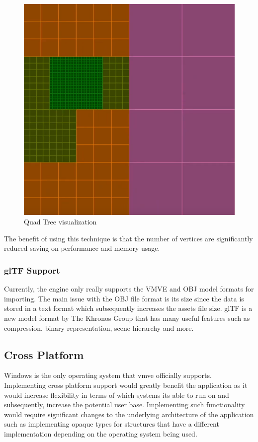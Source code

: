\documentclass[11pt]{article}
\begin{document}
\begin{figure}[h!]
  \centering
  \includegraphics[width=\textwidth]{images/quad_tree.png}
  \caption{Quad Tree visualization}
  \label{fig:quad_tree}
\end{figure}

The benefit of using this technique is that the number of vertices are
significantly reduced saving on performance and memory usage.


\subsubsection{glTF Support}
Currently, the engine only really supports the VMVE and OBJ model formats for
importing. The main issue with the OBJ file format is its size since the data is
stored in a text format which subsequently increases the assets file size. glTF
\cite{gltf} is a new model format by The Khronos Group that has many useful
features such as compression, binary representation, scene hierarchy and more.

\subsection{Cross Platform}
Windows is the only operating system that \gls{vmve} officially supports.
Implementing cross platform support would greatly benefit the application as it
would increase flexibility in terms of which systems its able to run on and
subsequently, increase the potential user base. Implementing such functionality
would require significant changes to the underlying architecture of the
application such as implementing opaque types for structures that have a
different implementation depending on the operating system being used.
\end{document}
